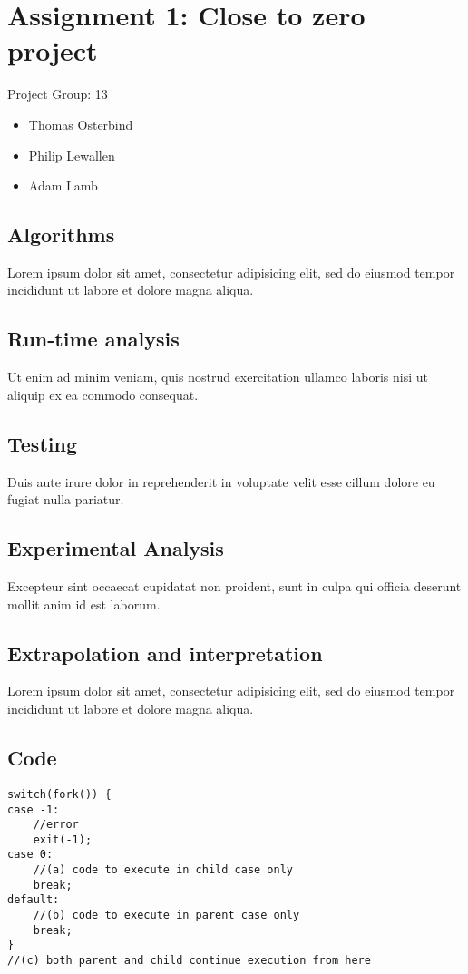 \documentclass{article}
\begin{document}
\section*{Assignment 1: Close to zero project}
Project Group: 13
\begin{itemize}
  \item[] Thomas Osterbind
  \item[] Philip Lewallen
  \item[] Adam Lamb
\end{itemize} 

\subsection*{Algorithms} 
Lorem ipsum dolor sit amet, consectetur adipisicing elit, sed do eiusmod
tempor incididunt ut labore et dolore magna aliqua. 

\subsection*{Run-time analysis}
Ut enim ad minim veniam,
quis nostrud exercitation ullamco laboris nisi ut aliquip ex ea commodo
consequat. 

\subsection*{Testing}
Duis aute irure dolor in reprehenderit in voluptate velit esse
cillum dolore eu fugiat nulla pariatur. 

\subsection*{Experimental Analysis}
Excepteur sint occaecat cupidatat non
proident, sunt in culpa qui officia deserunt mollit anim id est laborum.

\subsection*{Extrapolation and interpretation}
Lorem ipsum dolor sit amet, consectetur adipisicing elit, sed do eiusmod
tempor incididunt ut labore et dolore magna aliqua. 

\subsection*{Code}
\begin{lstlisting}
switch(fork()) {
case -1:
    //error
    exit(-1);
case 0:
    //(a) code to execute in child case only
    break;
default:
    //(b) code to execute in parent case only
    break;
}
//(c) both parent and child continue execution from here
\end{lstlisting}
\end{document}
